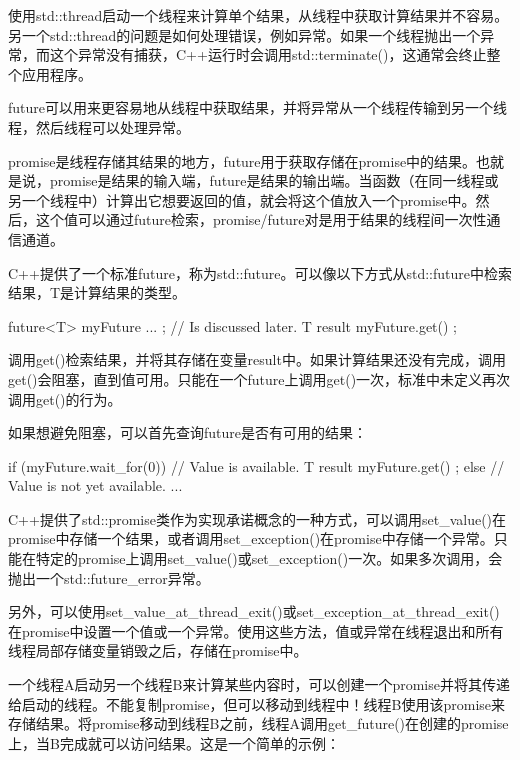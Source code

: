 
使用std::thread启动一个线程来计算单个结果，从线程中获取计算结果并不容易。另一个std::thread的问题是如何处理错误，例如异常。如果一个线程抛出一个异常，而这个异常没有捕获，C++运行时会调用std::terminate()，这通常会终止整个应用程序。

future可以用来更容易地从线程中获取结果，并将异常从一个线程传输到另一个线程，然后线程可以处理异常。

promise是线程存储其结果的地方，future用于获取存储在promise中的结果。也就是说，promise是结果的输入端，future是结果的输出端。当函数（在同一线程或另一个线程中）计算出它想要返回的值，就会将这个值放入一个promise中。然后，这个值可以通过future检索，promise/future对是用于结果的线程间一次性通信通道。

C++提供了一个标准future，称为std::future。可以像以下方式从std::future中检索结果，T是计算结果的类型。

\begin{cpp}
future<T> myFuture { ... }; // Is discussed later.
T result { myFuture.get() };
\end{cpp}

调用get()检索结果，并将其存储在变量result中。如果计算结果还没有完成，调用get()会阻塞，直到值可用。只能在一个future上调用get()一次，标准中未定义再次调用get()的行为。

如果想避免阻塞，可以首先查询future是否有可用的结果：

\begin{cpp}
if (myFuture.wait_for(0)) { // Value is available.
    T result { myFuture.get() };
} else { // Value is not yet available.
    ...
}
\end{cpp}


C++提供了std::promise类作为实现承诺概念的一种方式，可以调用set\_value()在promise中存储一个结果，或者调用set\_exception()在promise中存储一个异常。只能在特定的promise上调用set\_value()或set\_exception()一次。如果多次调用，会抛出一个std::future\_error异常。

另外，可以使用set\_value\_at\_thread\_exit()或set\_exception\_at\_thread\_exit()在promise中设置一个值或一个异常。使用这些方法，值或异常在线程退出和所有线程局部存储变量销毁之后，存储在promise中。

一个线程A启动另一个线程B来计算某些内容时，可以创建一个promise并将其传递给启动的线程。不能复制promise，但可以移动到线程中！线程B使用该promise来存储结果。将promise移动到线程B之前，线程A调用get\_future()在创建的promise上，当B完成就可以访问结果。这是一个简单的示例：

